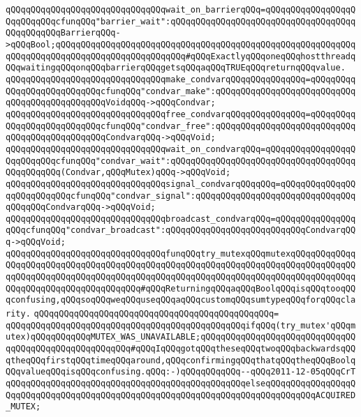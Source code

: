 \verb|qQQqqQQqqQQqqQQqqQQqqQQqqQQqqQQqwait_on_barrierqQQq=qQQqqQQqqQQqqQQqqQQqqQQqqQQqcfunqQQq"barrier_wait":qQQqqQQqqQQqqQQqqQQqqQQqqQQqqQQqqQQqqQQqqQQqqQQqBarrierqQQq->qQQqBool;qQQqqQQqqQQqqQQqqQQqqQQqqQQqqQQqqQQqqQQqqQQqqQQqqQQqqQQqqQQqqQQqqQQqqQQqqQQqqQQqqQQqqQQqqQQqqQQq#qQQqExactlyqQQqoneqQQqhostthreadqQQqwaitingqQQqonqQQqbarrierqQQqgetsqQQqaqQQqTRUEqQQqreturnqQQqvalue.|\newline
\newline
\verb|qQQqqQQqqQQqqQQqqQQqqQQqqQQqqQQqmake_condvarqQQqqQQqqQQqqQQq=qQQqqQQqqQQqqQQqqQQqqQQqqQQqcfunqQQq"condvar_make":qQQqqQQqqQQqqQQqqQQqqQQqqQQqqQQqqQQqqQQqqQQqqQQqVoidqQQq->qQQqCondvar;|\newline
\verb|qQQqqQQqqQQqqQQqqQQqqQQqqQQqqQQqfree_condvarqQQqqQQqqQQqqQQq=qQQqqQQqqQQqqQQqqQQqqQQqqQQqcfunqQQq"condvar_free":qQQqqQQqqQQqqQQqqQQqqQQqqQQqqQQqqQQqqQQqqQQqqQQqCondvarqQQq->qQQqVoid;|\newline
\verb|qQQqqQQqqQQqqQQqqQQqqQQqqQQqqQQqwait_on_condvarqQQq=qQQqqQQqqQQqqQQqqQQqqQQqqQQqcfunqQQq"condvar_wait":qQQqqQQqqQQqqQQqqQQqqQQqqQQqqQQqqQQqqQQqqQQqqQQq(Condvar,qQQqMutex)qQQq->qQQqVoid;|\newline
\verb|qQQqqQQqqQQqqQQqqQQqqQQqqQQqqQQqsignal_condvarqQQqqQQq=qQQqqQQqqQQqqQQqqQQqqQQqqQQqcfunqQQq"condvar_signal":qQQqqQQqqQQqqQQqqQQqqQQqqQQqqQQqqQQqqQQqCondvarqQQq->qQQqVoid;|\newline
\verb|qQQqqQQqqQQqqQQqqQQqqQQqqQQqqQQqbroadcast_condvarqQQq=qQQqqQQqqQQqqQQqqQQqcfunqQQq"condvar_broadcast":qQQqqQQqqQQqqQQqqQQqqQQqqQQqCondvarqQQq->qQQqVoid;|\newline
\newline
\verb|qQQqqQQqqQQqqQQqqQQqqQQqqQQqqQQqfunqQQqtry_mutexqQQqmutexqQQqqQQqqQQqqQQqqQQqqQQqqQQqqQQqqQQqqQQqqQQqqQQqqQQqqQQqqQQqqQQqqQQqqQQqqQQqqQQqqQQqqQQqqQQqqQQqqQQqqQQqqQQqqQQqqQQqqQQqqQQqqQQqqQQqqQQqqQQqqQQqqQQqqQQqqQQqqQQqqQQqqQQqqQQqqQQqqQQq#qQQqReturningqQQqaqQQqBoolqQQqisqQQqtooqQQqconfusing,qQQqsoqQQqweqQQquseqQQqaqQQqcustomqQQqsumtypeqQQqforqQQqclarity.|\newline
\verb|qQQqqQQqqQQqqQQqqQQqqQQqqQQqqQQqqQQqqQQqqQQqqQQq=|\newline
\verb|qQQqqQQqqQQqqQQqqQQqqQQqqQQqqQQqqQQqqQQqqQQqqQQqifqQQq(try_mutex'qQQqmutex)qQQqqQQqqQQqMUTEX_WAS_UNAVAILABLE;qQQqqQQqqQQqqQQqqQQqqQQqqQQqqQQqqQQqqQQqqQQqqQQqqQQqqQQq#qQQqIqQQqgotqQQqtheseqQQqtwoqQQqbackwardsqQQqtheqQQqfirstqQQqtimeqQQqaround,qQQqconfirmingqQQqthatqQQqtheqQQqBoolqQQqvalueqQQqisqQQqconfusing.qQQq:-)qQQqqQQqqQQq--qQQq2011-12-05qQQqCrT|\newline
\verb|qQQqqQQqqQQqqQQqqQQqqQQqqQQqqQQqqQQqqQQqqQQqqQQqelseqQQqqQQqqQQqqQQqqQQqqQQqqQQqqQQqqQQqqQQqqQQqqQQqqQQqqQQqqQQqqQQqqQQqqQQqqQQqqQQqACQUIRED_MUTEX;|\newline
